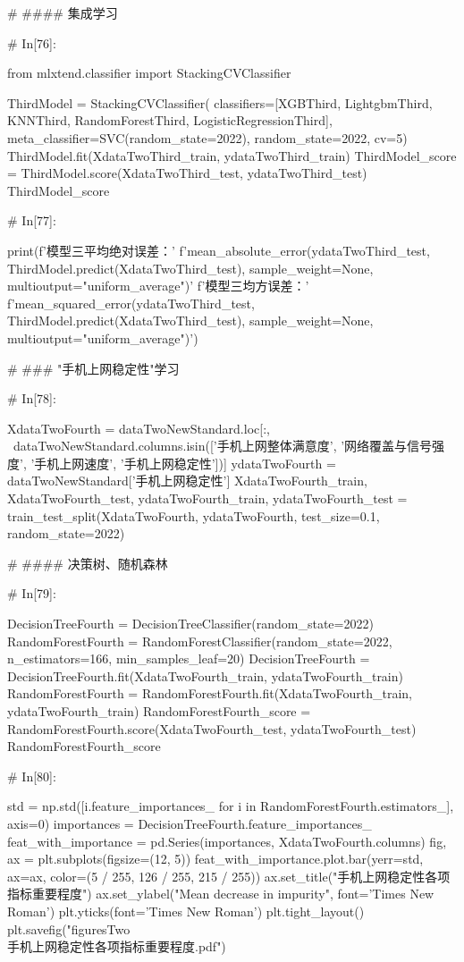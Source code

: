 \documentclass{MathorCupmodeling}
\begin{document}
\begin{python}
	# #### 集成学习
	
	# In[76]:
	
	
	from mlxtend.classifier import StackingCVClassifier
	
	ThirdModel = StackingCVClassifier(
		classifiers=[XGBThird, LightgbmThird, KNNThird, RandomForestThird, LogisticRegressionThird],
		meta_classifier=SVC(random_state=2022), random_state=2022, cv=5)
	ThirdModel.fit(XdataTwoThird_train, ydataTwoThird_train)
	ThirdModel_score = ThirdModel.score(XdataTwoThird_test, ydataTwoThird_test)
	ThirdModel_score
	
	# In[77]:
	
	
	print(f'模型三平均绝对误差：'
		  f'{mean_absolute_error(ydataTwoThird_test, ThirdModel.predict(XdataTwoThird_test), sample_weight=None, multioutput="uniform_average")}\n'
		  f'模型三均方误差：'
		  f'{mean_squared_error(ydataTwoThird_test, ThirdModel.predict(XdataTwoThird_test), sample_weight=None, multioutput="uniform_average")}')
	
	# ### "手机上网稳定性"学习
	
	# In[78]:
	
	
	XdataTwoFourth = dataTwoNewStandard.loc[:, ~dataTwoNewStandard.columns.isin(['手机上网整体满意度', '网络覆盖与信号强度', '手机上网速度', '手机上网稳定性'])]
	ydataTwoFourth = dataTwoNewStandard['手机上网稳定性']
	XdataTwoFourth_train, XdataTwoFourth_test, ydataTwoFourth_train, ydataTwoFourth_test = train_test_split(XdataTwoFourth, ydataTwoFourth, test_size=0.1, random_state=2022)
	
	# #### 决策树、随机森林
	
	# In[79]:
	
	
	DecisionTreeFourth = DecisionTreeClassifier(random_state=2022)
	RandomForestFourth = RandomForestClassifier(random_state=2022, n_estimators=166, min_samples_leaf=20)
	DecisionTreeFourth = DecisionTreeFourth.fit(XdataTwoFourth_train, ydataTwoFourth_train)
	RandomForestFourth = RandomForestFourth.fit(XdataTwoFourth_train, ydataTwoFourth_train)
	RandomForestFourth_score = RandomForestFourth.score(XdataTwoFourth_test, ydataTwoFourth_test)
	RandomForestFourth_score
	
	# In[80]:
	
	
	std = np.std([i.feature_importances_ for i in RandomForestFourth.estimators_], axis=0)
	importances = DecisionTreeFourth.feature_importances_
	feat_with_importance = pd.Series(importances, XdataTwoFourth.columns)
	fig, ax = plt.subplots(figsize=(12, 5))
	feat_with_importance.plot.bar(yerr=std, ax=ax, color=(5 / 255, 126 / 255, 215 / 255))
	ax.set_title("手机上网稳定性各项指标重要程度")
	ax.set_ylabel("Mean decrease in impurity", font='Times New Roman')
	plt.yticks(font='Times New Roman')
	plt.tight_layout()
	plt.savefig("figuresTwo\\[附件2]手机上网稳定性各项指标重要程度.pdf")
	

\end{python}
\end{document}
